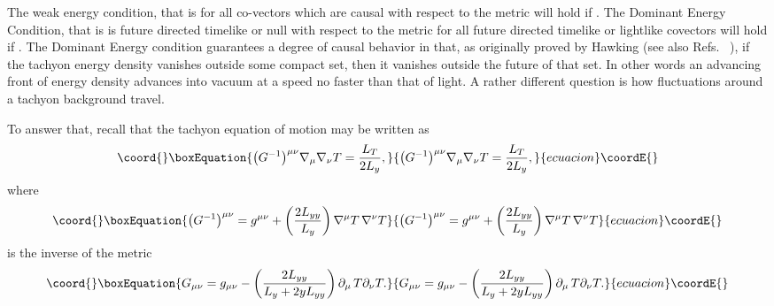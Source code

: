 \documentclass[a4paper,12pt]{article}
\begin{document}
The weak energy condition, that is \coordHE{}
for all co-vectors \coordHE{} which are causal with respect to the
metric \coordHE{}  will hold if  \coordHE{}. The
Dominant Energy Condition, that is \coordHE{} is future
directed timelike or null with respect to the metric \coordHE{}
for all future directed timelike or lightlike covectors \coordHE{}
will hold if \coordHE{}. The Dominant Energy condition
guarantees a degree of causal behavior in that, as originally
proved by Hawking \cite{Hawking} (see also Refs.\
\cite{Gibbons2, Carter} ),  
if the tachyon energy density vanishes outside some
compact set, then it vanishes outside the future of that set. In
other words an advancing front of  energy density advances into
vacuum at a speed no faster than that of light. A rather different
question is how fluctuations around a  tachyon background travel.


To answer that,  recall that the tachyon equation of motion may be
written as 
\begin{equation}\coord{}\boxEquation{ 
\bigl ( G^{-1} \bigr )  ^{\mu \nu} \nabla _\mu
\nabla _\nu T = \frac{L_T}{2 L_y} , 
}{ 
\bigl ( G^{-1} \bigr )  ^{\mu \nu} \nabla _\mu
\nabla _\nu T = \frac{L_T}{2 L_y} , 
}{ecuacion}\coordE{}\end{equation}
where \begin{equation}\coord{}\boxEquation{ 
\bigl (G^{-1} \bigr ) ^{\mu \nu} = g^{\mu \nu} + 
\left( \frac{2 L_{yy}}{L_y} \right)  \nabla ^\mu T \thinspace \nabla
^ \nu T 
\label{inverse}
}{ 
\bigl (G^{-1} \bigr ) ^{\mu \nu} = g^{\mu \nu} + 
\left( \frac{2 L_{yy}}{L_y} \right)  \nabla ^\mu T \thinspace \nabla
^ \nu T 
}{ecuacion}\coordE{}\end{equation} 
is the inverse of the metric
\begin{equation}\coord{}\boxEquation{ 
G_{\mu\nu} = g_{\mu \nu} - 
\left( \frac{2 L_{yy}}{L_y + 2 y L_{yy}}\right)
\partial _\mu \thinspace T \partial _\nu T .  
\label{inversem}
}{ 
G_{\mu\nu} = g_{\mu \nu} - 
\left( \frac{2 L_{yy}}{L_y + 2 y L_{yy}}\right)
\partial _\mu \thinspace T \partial _\nu T .  
}{ecuacion}\coordE{}\end{equation}
\end{document}
